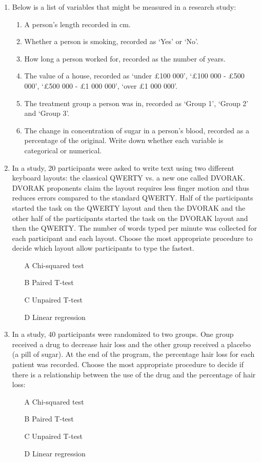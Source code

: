\documentclass{article}
\newif\ifanswer
\begin{document}
\begin{enumerate}
\item Below is a list of variables that might be measured in a research study:
\begin{enumerate}
\item A person's length recorded in cm.
\item Whether a person is smoking, recorded as \lq{}Yes\rq{} or \lq{}No\rq{}.
\item How long a person worked for, recorded as the number of years.
\item The value of a house, recorded as \lq{}under \pounds 100 000\rq{}, \lq{}\pounds 100 000 - \pounds 500 000\rq{}, \lq{}\pounds 500 000 - \pounds 1 000 000\rq{}, \lq{}over \pounds 1 000 000\rq{}.
\item The treatment group a person was in, recorded as \lq{}Group 1\rq{}, \lq{}Group 2\rq{} and \lq{}Group 3\rq{}.
\item The change in concentration of sugar in a person's blood, recorded as a percentage of the original.
Write down whether each variable is categorical or numerical.
\end{enumerate}

\ifanswer
 (Answer: b, d, e are categorical; a, c, f are numerical.)
\fi

\item In a study, 20 participants were asked to write text using two
  different keyboard layouts: the classical QWERTY vs. a new one
  called DVORAK. DVORAK proponents claim the layout requires less
  finger motion and thus reduces errors compared to the standard
  QWERTY. Half of the participants started the task on the QWERTY
  layout and then the DVORAK and the other half of the participants
  started the task on the DVORAK layout and then the QWERTY. The
  number of words typed per minute was collected for each participant
  and each layout. Choose the most appropriate procedure to decide
  which layout allow participants to type the fastest.
  \begin{itemize}
    \item[A] Chi-squared test 
\item[B] Paired T-test
\item[C] Unpaired T-test
\item[D] Linear regression
  \end{itemize}
  
\ifanswer
(Answer: B)
\fi

\item In a study, 40 participants were randomized to two groups. One
  group received a drug to decrease hair loss and the other group
  received a placebo (a pill of sugar). At the end of the program, the
  percentage hair loss for each patient was recorded. Choose the most
  appropriate procedure to decide if there is a relationship between
  the use of the drug and the percentage of hair loss:
\begin{itemize}
\item[A] Chi-squared test 
\item[B] Paired T-test
\item[C] Unpaired T-test
\item[D] Linear regression
\end{itemize}


\end{enumerate}
\end{document}
